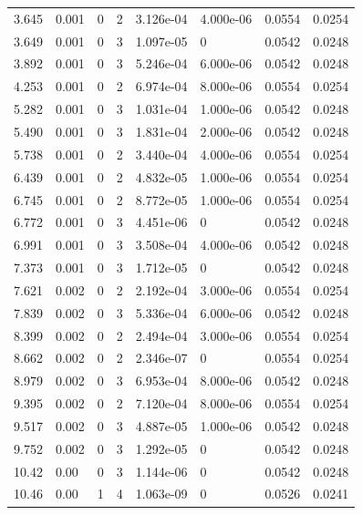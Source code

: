 \documentclass[preview]{standalone}
\begin{document}
{{\begin{tabular}{L{1.2cm}C{1.2cm} C{0.3cm}C{0.5cm} C{1.4cm}C{1.4cm} C{1.4cm}C{1.4cm}}
  3.645  &  0.001  & 0     &  2 &  3.126e-04  & 4.000e-06  & 0.0554 &  0.0254   \\ 
  3.649  &  0.001  & 0     &  3 &  1.097e-05  & 0  & 0.0542 &  0.0248   \\ 
  3.892  &  0.001  & 0     &  3 &  5.246e-04  & 6.000e-06  & 0.0542 &  0.0248   \\ 
  4.253  &  0.001  & 0     &  2 &  6.974e-04  & 8.000e-06  & 0.0554 &  0.0254   \\ 
  5.282  &  0.001  & 0     &  3 &  1.031e-04  & 1.000e-06  & 0.0542 &  0.0248   \\ 
  5.490  &  0.001  & 0     &  3 &  1.831e-04  & 2.000e-06  & 0.0542 &  0.0248   \\ 
  5.738  &  0.001  & 0     &  2 &  3.440e-04  & 4.000e-06  & 0.0554 &  0.0254   \\ 
  6.439  &  0.001  & 0     &  2 &  4.832e-05  & 1.000e-06  & 0.0554 &  0.0254   \\ 
  6.745  &  0.001  & 0     &  2 &  8.772e-05  & 1.000e-06  & 0.0554 &  0.0254   \\ 
  6.772  &  0.001  & 0     &  3 &  4.451e-06  & 0  & 0.0542 &  0.0248   \\ 
  6.991  &  0.001  & 0     &  3 &  3.508e-04  & 4.000e-06  & 0.0542 &  0.0248   \\ 
  7.373  &  0.001  & 0     &  3 &  1.712e-05  & 0  & 0.0542 &  0.0248   \\ 
  7.621  &  0.002  & 0     &  2 &  2.192e-04  & 3.000e-06  & 0.0554 &  0.0254   \\ 
  7.839  &  0.002  & 0     &  3 &  5.336e-04  & 6.000e-06  & 0.0542 &  0.0248   \\ 
  8.399  &  0.002  & 0     &  2 &  2.494e-04  & 3.000e-06  & 0.0554 &  0.0254   \\ 
  8.662  &  0.002  & 0     &  2 &  2.346e-07  & 0  & 0.0554 &  0.0254   \\ 
  8.979  &  0.002  & 0     &  3 &  6.953e-04  & 8.000e-06  & 0.0542 &  0.0248   \\ 
  9.395  &  0.002  & 0     &  2 &  7.120e-04  & 8.000e-06  & 0.0554 &  0.0254   \\ 
  9.517  &  0.002  & 0     &  3 &  4.887e-05  & 1.000e-06  & 0.0542 &  0.0248   \\ 
  9.752  &  0.002  & 0     &  3 &  1.292e-05  & 0  & 0.0542 &  0.0248   \\ 
  10.42  &  0.00  & 0     &  3 &  1.144e-06  & 0  & 0.0542 &  0.0248   \\ 
  10.46  &  0.00  & 1     &  4 &  1.063e-09  & 0  & 0.0526 &  0.0241   \\ 

\end{tabular}}}
\end{document}
